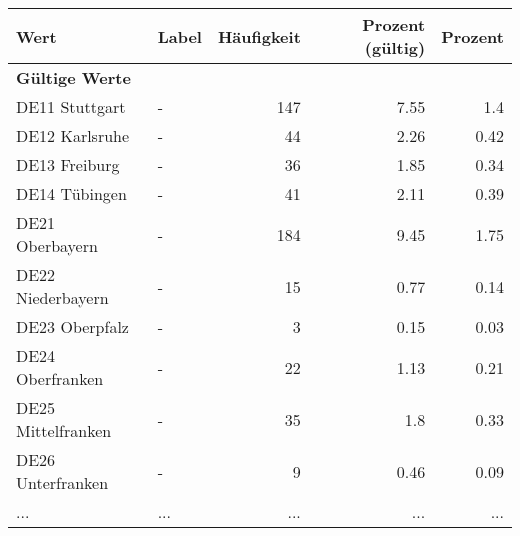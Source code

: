      \begin{longtable}{Xlrrr}
     \toprule
     \textbf{Wert} & \textbf{Label} & \textbf{Häufigkeit} & \textbf{Prozent (gültig)} & \textbf{Prozent} \\
     \endhead
     \midrule
     \multicolumn{5}{l}{\textbf{Gültige Werte}}\\
        \multicolumn{1}{X}{DE11 Stuttgart} & - & \num{147} & \num[round-mode=places,round-precision=2]{7.55} & \num[round-mode=places,round-precision=2]{1.4} \\
        \multicolumn{1}{X}{DE12 Karlsruhe} & - & \num{44} & \num[round-mode=places,round-precision=2]{2.26} & \num[round-mode=places,round-precision=2]{0.42} \\
        \multicolumn{1}{X}{DE13 Freiburg} & - & \num{36} & \num[round-mode=places,round-precision=2]{1.85} & \num[round-mode=places,round-precision=2]{0.34} \\
        \multicolumn{1}{X}{DE14 Tübingen} & - & \num{41} & \num[round-mode=places,round-precision=2]{2.11} & \num[round-mode=places,round-precision=2]{0.39} \\
        \multicolumn{1}{X}{DE21 Oberbayern} & - & \num{184} & \num[round-mode=places,round-precision=2]{9.45} & \num[round-mode=places,round-precision=2]{1.75} \\
        \multicolumn{1}{X}{DE22 Niederbayern} & - & \num{15} & \num[round-mode=places,round-precision=2]{0.77} & \num[round-mode=places,round-precision=2]{0.14} \\
        \multicolumn{1}{X}{DE23 Oberpfalz} & - & \num{3} & \num[round-mode=places,round-precision=2]{0.15} & \num[round-mode=places,round-precision=2]{0.03} \\
        \multicolumn{1}{X}{DE24 Oberfranken} & - & \num{22} & \num[round-mode=places,round-precision=2]{1.13} & \num[round-mode=places,round-precision=2]{0.21} \\
        \multicolumn{1}{X}{DE25 Mittelfranken} & - & \num{35} & \num[round-mode=places,round-precision=2]{1.8} & \num[round-mode=places,round-precision=2]{0.33} \\
        \multicolumn{1}{X}{DE26 Unterfranken} & - & \num{9} & \num[round-mode=places,round-precision=2]{0.46} & \num[round-mode=places,round-precision=2]{0.09} \\
       ... & ... & ... & ... & ... \\

\end{longtable}
